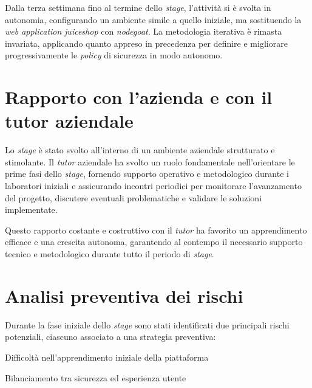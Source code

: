 Dalla terza settimana fino al termine dello \emph{stage}, l'attività si è svolta in autonomia, configurando un ambiente simile a quello iniziale, ma sostituendo la \emph{web application} \emph{\gls{juiceshop}} con \emph{\gls{nodegoat}}. La metodologia iterativa è rimasta invariata, applicando quanto appreso in precedenza per definire e migliorare progressivamente le \emph{\gls{policy}} di sicurezza in modo autonomo.

\section{Rapporto con l'azienda e con il tutor aziendale}

Lo \emph{stage} è stato svolto all'interno di un ambiente aziendale strutturato e stimolante. Il \emph{tutor} aziendale ha svolto un ruolo fondamentale nell'orientare le prime fasi dello \emph{stage}, fornendo supporto operativo e metodologico durante i laboratori iniziali e assicurando incontri periodici per monitorare l'avanzamento del progetto, discutere eventuali problematiche e validare le soluzioni implementate.

Questo rapporto costante e costruttivo con il \emph{tutor} ha favorito un apprendimento efficace e una crescita autonoma, garantendo al contempo il necessario supporto tecnico e metodologico durante tutto il periodo di \emph{stage}.

\section{Analisi preventiva dei rischi}

Durante la fase iniziale dello \emph{stage} sono stati identificati due principali rischi potenziali, ciascuno associato a una strategia preventiva:

\begin{risk}{Difficoltà nell'apprendimento iniziale della piattaforma}
    \label{risk:learning-waf} 
\end{risk}

\begin{risk}{Bilanciamento tra sicurezza ed esperienza utente}
    \label{risk:policy-tuning} 
\end{risk}

\clearpage